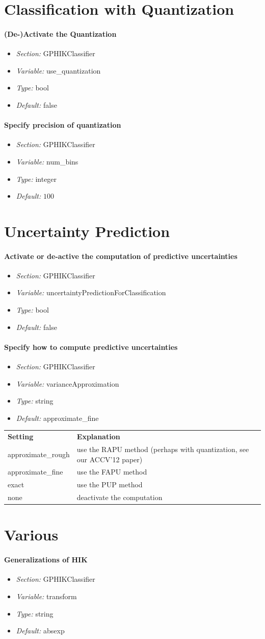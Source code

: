 \documentclass[a4paper]{scrreprt}
\newcommand{\confSection}[1]{\textit{Section: } #1}
\newcommand{\variable}[1]{\textit{Variable: } #1}
\newcommand{\variableType}[1]{\textit{Type: } #1}
\newcommand{\default}[1]{\textit{Default: } #1}
\newcommand{\infos}[4]{
	\begin{itemize}
	  \setlength{\itemsep}{-0.5em}
	  \item \confSection{#1}
	  \item \variable{#2}
	  \item \variableType{#3}
	  \item \default{#4}
	\end{itemize}
     }
\begin{document}
\section{Classification with Quantization}
  \paragraph{(De-)Activate the Quantization}
    \infos{GPHIKClassifier}{use\_quantization}{bool}{false}
  \paragraph{Specify precision of quantization}
    \infos{GPHIKClassifier}{num\_bins}{integer}{$100$}

\section{Uncertainty Prediction}
\paragraph{Activate or de-active the computation of predictive uncertainties}
  \infos{GPHIKClassifier}{uncertaintyPredictionForClassification}{bool}{false}

\paragraph{Specify how to compute predictive uncertainties}
  \infos{GPHIKClassifier}{varianceApproximation}{string}{approximate\_fine}

  \begin{tabular}{ll}
    \textbf{Setting} & \textbf{Explanation} \\
      approximate\_rough &  use the RAPU method (perhaps with quantization, see our ACCV'12 paper)\\
      approximate\_fine &  use the FAPU method \\
      exact &  use the PUP method\\
      none &  deactivate the computation \\
  \end{tabular}


\section{Various}
% 
  \paragraph{Generalizations of HIK}
    \infos{GPHIKClassifier}{transform}{string}{absexp}
\end{document}
